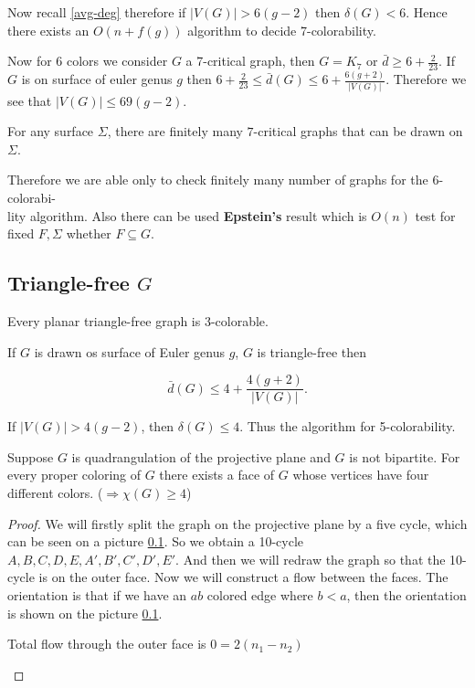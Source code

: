 \begin{observ}
	Now recall \ref{avg-deg} therefore if $|V(G)| > 6(g-2)$ then $\delta(G) < 6$. Hence there exists an $O(n + f(g))$ algorithm to decide 7-colorability.
\end{observ}

Now for 6 colors we consider $G$ a 7-critical graph, then $G = K_7$ or $\bar{d} \geq 6 + \frac{2}{23}$. If $G$ is on surface of euler genus $g$ then $6 + \frac{2}{23} \leq \bar{d}(G) \leq 6 + \frac{6(g+2)}{|V(G)|}$. Therefore we see that $|V(G)| \leq 69(g-2)$.

\begin{cor}
	For any surface $\Sigma$, there are finitely many $7$-critical graphs that can be drawn on $\Sigma$.
\end{cor}

Therefore we are able only to check finitely many number of graphs for the 6-colorabi-\\lity algorithm. Also there can be used \textbf{Epstein's} result which is $O(n)$ test for fixed $F, \Sigma$ whether $F \subseteq G$.

\subsection{Triangle-free $G$}

\begin{thm}[Grötsch]
	Every planar triangle-free graph is 3-colorable.
\end{thm}

\begin{lemma}
	If $G$ is drawn os surface of Euler genus $g$, $G$ is triangle-free then
	
	$$
	\bar{d}(G) \leq 4 + \frac{4 (g+2)}{|V(G)|}.
	$$
\end{lemma}

\begin{observ}
	If $|V(G)| > 4(g-2)$, then $\delta(G) \leq 4$. Thus the algorithm for 5-colorability.
\end{observ}

\begin{lemma}
	Suppose $G$ is quadrangulation of the projective plane and $G$ is not bipartite. For every proper coloring of $G$ there exists a face of $G$ whose vertices have four different colors. ($\Rightarrow \chi(G) \geq 4$)
\end{lemma}

\begin{proof}
	We will firstly split the graph on the projective plane by a five cycle, which can be seen on a picture \ref{}. So we obtain a 10-cycle $A,B,C,D,E,A',B',C',D',E'$. And then we will redraw the graph so that the 10-cycle is on the outer face. Now we will construct a flow between the faces. The orientation is that if we have an $ab$ colored edge where $b < a$, then the orientation is shown on the picture \ref{}.
	
	\begin{observ}
		Total flow through the outer face is $0 = 2 (n_1 - n_2)$
	\end{observ}
\end{proof}

